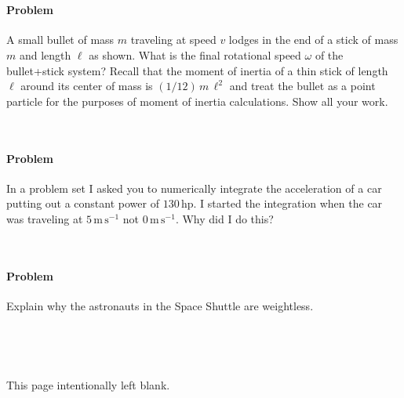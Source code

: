 \documentclass[12pt,letterpaper]{article}
\newcommand{\m}{\mathrm{m}}
\newcommand{\s}{\mathrm{s}}
\newcommand{\mps}{\m\,\s^{-1}}
\newcommand{\hp}{\mathrm{hp}}
\newcounter{problem}
\begin{document}
~ \vfill ~

\paragraph{Problem~\theproblem}%
A small bullet of mass $m$ traveling at speed $v$ lodges in the end of
a stick of mass $m$ and length $\ell$ as shown.  What is the final
rotational speed $\omega$ of the bullet+stick system?  Recall that the
moment of inertia of a thin stick of length $\ell$ around its center
of mass is $(1/12)\,m\,\ell^2$ and treat the bullet as a point
particle for the purposes of moment of inertia calculations.  Show all
your work.%
%

~ \vfill ~

\clearpage

\paragraph{Problem~\theproblem}%
In a problem set I asked you to numerically integrate the acceleration
of a car putting out a constant power of $130\,\hp$.  I started the
integration when the car was traveling at $5\,\mps$ not $0\,\mps$.
Why did I do this?

~ \vfill ~

\paragraph{Problem~\theproblem}%
Explain why the astronauts in the Space Shuttle are weightless.

~ \vfill ~

\clearpage

~ \vfill ~

This page intentionally left blank.

~ \vfill ~
\end{document}
